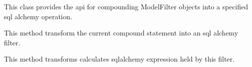 \documentclass[letterpaper,10pt,english]{sphinxmanual}
\begin{document}
\begin{fulllineitems}
\label{features/mvc:fantastico.mvc.models.model_filter_compound.ModelFilterCompound}
This class provides the api for compounding ModelFilter objects into a specified sql alchemy operation.

\begin{fulllineitems}
\label{features/mvc:fantastico.mvc.models.model_filter_compound.ModelFilterCompound.build}
This method transform the current compound statement into an sql alchemy filter.

\end{fulllineitems}


\begin{fulllineitems}
\label{features/mvc:fantastico.mvc.models.model_filter_compound.ModelFilterCompound.get_expression}
This method transforms calculates sqlalchemy expression held by this filter.

\end{fulllineitems}


\end{fulllineitems}

\end{document}
